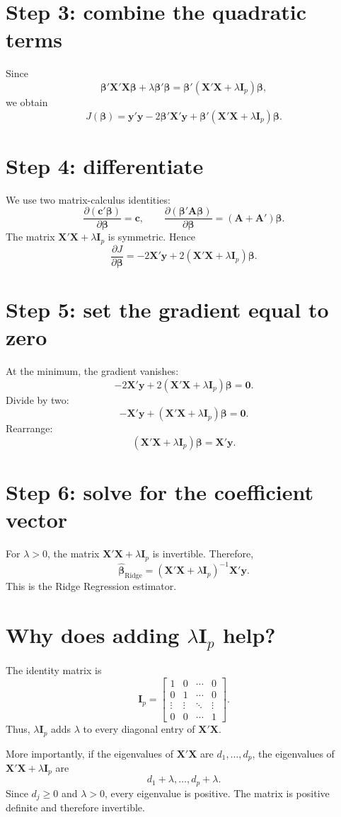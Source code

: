 \documentclass[11pt,a4paper,oneside]{book}
\theoremstyle{remark}
\newcommand{\X}{\mathbf X}
\newcommand{\y}{\mathbf y}
\newcommand{\I}{\mathbf I}
\newcommand{\bta}{\boldsymbol{\beta}}
\newcommand{\bhat}{\widehat{\boldsymbol{\beta}}}
\begin{document}
\section{Step 3: combine the quadratic terms}
Since
\[
\bta'\X'\X\bta+\lambda\bta'\bta
=\bta'(\X'\X+\lambda\I_p)\bta,
\]
we obtain
\[
J(\bta)=\y'\y-2\bta'\X'\y+
\bta'(\X'\X+\lambda\I_p)\bta.
\]

\section{Step 4: differentiate}
We use two matrix-calculus identities:
\[
\frac{\partial(\mathbf c'\bta)}{\partial\bta}=\mathbf c,
\qquad
\frac{\partial(\bta'\mathbf A\bta)}{\partial\bta}
=(\mathbf A+\mathbf A')\bta.
\]
The matrix $\X'\X+\lambda\I_p$ is symmetric. Hence
\[
\frac{\partial J}{\partial\bta}
=-2\X'\y+2(\X'\X+\lambda\I_p)\bta.
\]

\section{Step 5: set the gradient equal to zero}
At the minimum, the gradient vanishes:
\[
-2\X'\y+2(\X'\X+\lambda\I_p)\bta=\mathbf 0.
\]
Divide by two:
\[
-\X'\y+(\X'\X+\lambda\I_p)\bta=\mathbf 0.
\]
Rearrange:
\[
(\X'\X+\lambda\I_p)\bta=\X'\y.
\]

\section{Step 6: solve for the coefficient vector}
For $\lambda>0$, the matrix $\X'\X+\lambda\I_p$ is invertible. Therefore,
\[
\boxed{
\bhat_{\mathrm{Ridge}}
=(\X'\X+\lambda\I_p)^{-1}\X'\y.
}
\]
This is the Ridge Regression estimator.

\section{Why does adding \texorpdfstring{$\lambda\I_p$}{lambda I\_p} help?}
The identity matrix is
\[
\I_p=
\begin{bmatrix}
1&0&\cdots&0\\
0&1&\cdots&0\\
\vdots&\vdots&\ddots&\vdots\\
0&0&\cdots&1
\end{bmatrix}.
\]
Thus, $\lambda\I_p$ adds $\lambda$ to every diagonal entry of $\X'\X$.

More importantly, if the eigenvalues of $\X'\X$ are
$d_1,\ldots,d_p$, the eigenvalues of
$\X'\X+\lambda\I_p$ are
\[
d_1+\lambda,\ldots,d_p+\lambda.
\]
Since $d_j\geq0$ and $\lambda>0$, every eigenvalue is positive. The matrix
is positive definite and therefore invertible.
\end{document}
